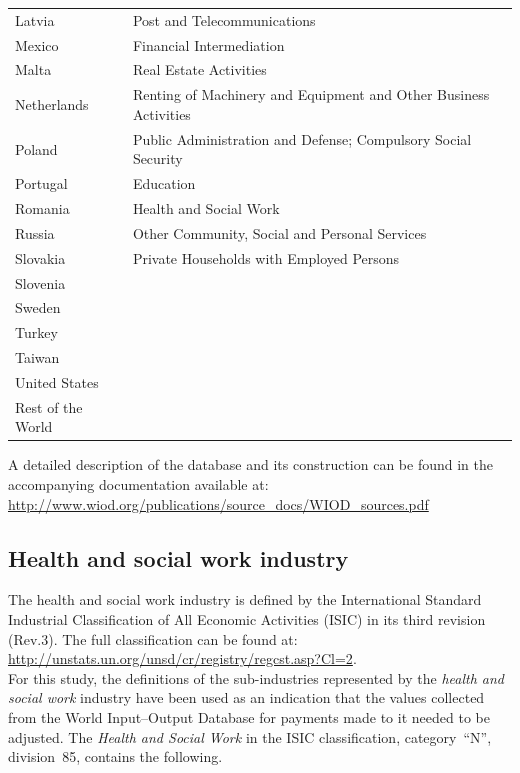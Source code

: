 \documentclass[a4paper,12pt]{article}
\begin{document}
\begin{table} [!hbtp]
\begin{center}
{\begin{tabular}{ll}
Latvia & Post and Telecommunications\\ 
Mexico & Financial Intermediation\\ 
Malta & Real Estate Activities\\ 
Netherlands & Renting of Machinery and Equipment and Other Business Activities\\ 
Poland & Public Administration and Defense; Compulsory Social Security\\ 
Portugal & Education\\ 
Romania & Health and Social Work\\ 
Russia & Other Community, Social and Personal Services\\ 
Slovakia & Private Households with Employed Persons\\ 
Slovenia & \\ 
Sweden & \\ 
Turkey & \\ 
Taiwan & \\ 
United States & \\ 
Rest of the World & \\
\hline
\end{tabular}}
\label{aptab01} 
\end{center}
\end{table}

A detailed description of the database and its construction can be found in the accompanying documentation available at:\\
\url{http://www.wiod.org/publications/source\_docs/WIOD\_sources.pdf}

\subsection{Health and social work industry}

The health and social work industry is defined by the International Standard Industrial Classification of All Economic Activities (ISIC) in its third revision (Rev.3). The full classification can be found at:\\

\url{http://unstats.un.org/unsd/cr/registry/regcst.asp?Cl=2}.\\

For this study, the definitions of the sub-industries represented by the \textit{health and social work} industry have been used as an indication that the values collected from the World Input--Output Database for payments made to it needed to be adjusted. The \textit{Health and Social Work} in the ISIC classification, category~``N'', division~85,  contains the following.
\end{document}
